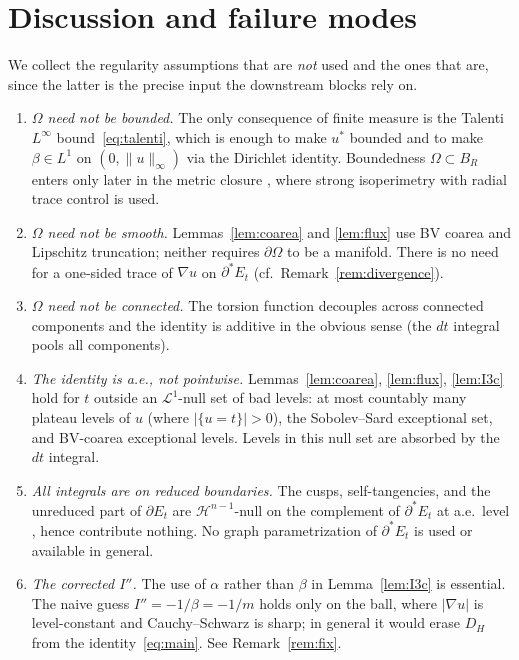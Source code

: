 \documentclass[11pt]{article}
\theoremstyle{definition}
\newcommand{\Om}{\Omega}
\begin{document}
\section{Discussion and failure modes}\label{sec:discussion}

We collect the regularity assumptions that are \emph{not} used and the
ones that are, since the latter is the precise input the downstream
blocks rely on.

\begin{enumerate}
\item \emph{$\Om$ need not be bounded.} The only consequence of finite
measure is the Talenti $L^{\infty}$ bound~\eqref{eq:talenti}, which is
enough to make $u^{*}$ bounded and to make $\beta\in L^{1}$ on
$(0,\|u\|_{\infty})$ via the Dirichlet identity. Boundedness
$\Om\subset B_{R}$ enters only later in the metric closure
\cite{MetricFramework,WeightedMetricTrace}, where strong isoperimetry
with radial trace control is used.

\item \emph{$\Om$ need not be smooth.} Lemmas~\ref{lem:coarea} and
\ref{lem:flux} use BV coarea and Lipschitz truncation; neither requires
$\partial\Om$ to be a manifold. There is no need for a one-sided trace
of $\nabla u$ on $\partial^{*}E_{t}$ (cf.\ Remark~\ref{rem:divergence}).

\item \emph{$\Om$ need not be connected.} The torsion function
decouples across connected components and the identity is additive in
the obvious sense (the $dt$ integral pools all components).

\item \emph{The identity is a.e., not pointwise.} Lemmas~\ref{lem:coarea},
\ref{lem:flux}, \ref{lem:I3c} hold for $t$ outside an $\mathcal L^{1}$-null
set of bad levels: at most countably many plateau levels of $u$ (where
$|\{u=t\}|>0$), the Sobolev--Sard exceptional set, and BV-coarea
exceptional levels. Levels in this null set are absorbed by the $dt$
integral.

\item \emph{All integrals are on reduced boundaries.} The cusps,
self-tangencies, and the unreduced part of $\partial E_{t}$ are
$\mathcal H^{n-1}$-null on the complement of $\partial^{*}E_{t}$ at
a.e.\ level \cite{DeGiorgi1958, Maggi2012}, hence contribute nothing.
No graph parametrization of $\partial^{*}E_{t}$ is used or available
in general.

\item \emph{The corrected $I''$.} The use of $\alpha$ rather than
$\beta$ in Lemma~\ref{lem:I3c} is essential. The naive guess
$I''=-1/\beta=-1/m$ holds only on the ball, where $|\nabla u|$ is
level-constant and Cauchy--Schwarz is sharp; in general it would erase
$D_{H}$ from the identity~\eqref{eq:main}. See Remark~\ref{rem:fix}.
\end{enumerate}
\end{document}
